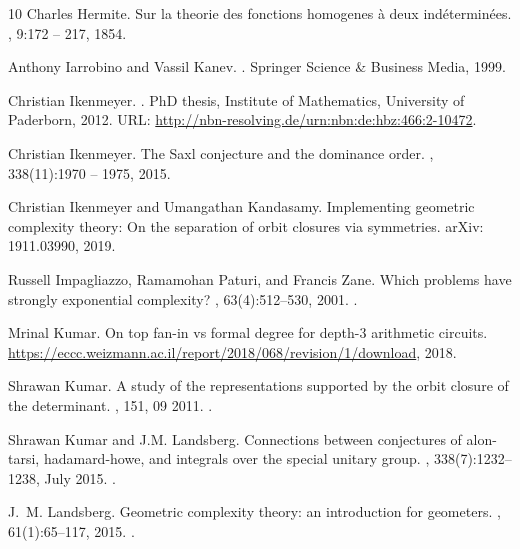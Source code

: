 \documentclass[10pt,a4paper]{article}
\numberwithin{equation}{section}
\theoremstyle{definition}
\begin{document}
\begin{thebibliography}{10}
Charles Hermite.
\newblock Sur la theorie des fonctions homogenes \`{a} deux
  ind\'{e}termin\'{e}es.
, 9:172 -- 217, 1854.

Anthony Iarrobino and Vassil Kanev.
.
\newblock Springer Science \& Business Media, 1999.

Christian Ikenmeyer.
.
\newblock PhD thesis, Institute of Mathematics, University of Paderborn, 2012.
\newblock URL: \url{http://nbn-resolving.de/urn:nbn:de:hbz:466:2-10472}.

Christian Ikenmeyer.
\newblock The {S}axl conjecture and the dominance order.
, 338(11):1970 -- 1975, 2015.

Christian Ikenmeyer and Umangathan Kandasamy.
\newblock Implementing geometric complexity theory: On the separation of orbit
  closures via symmetries.
\newblock arXiv: 1911.03990, 2019.

Russell Impagliazzo, Ramamohan Paturi, and Francis Zane.
\newblock Which problems have strongly exponential complexity?
, 63(4):512--530, 2001.
\newblock \href {https://doi.org/10.1006/jcss.2001.1774}
  {}.

Mrinal Kumar.
\newblock On top fan-in vs formal degree for depth-3 arithmetic circuits.
\newblock
  \url{https://eccc.weizmann.ac.il/report/2018/068/revision/1/download}, 2018.

Shrawan Kumar.
\newblock A study of the representations supported by the orbit closure of the
  determinant.
, 151, 09 2011.
\newblock \href {https://doi.org/10.1112/S0010437X14007660}
  {}.

Shrawan Kumar and J.M. Landsberg.
\newblock Connections between conjectures of alon-tarsi, hadamard-howe, and
  integrals over the special unitary group.
, 338(7):1232--1238, July 2015.
\newblock \href {https://doi.org/10.1016/j.disc.2015.01.027}
  {}.

J.~M. Landsberg.
\newblock Geometric complexity theory: an introduction for geometers.
, 61(1):65--117, 2015.
\newblock \href {https://doi.org/10.1007/s11565-014-0202-7}
  {}.


\end{thebibliography}
\end{document}
